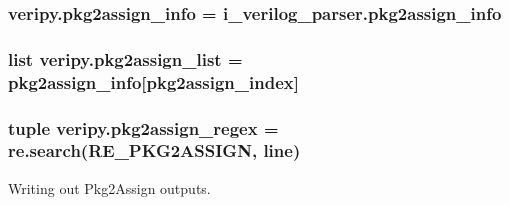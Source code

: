 \hypertarget{namespaceveripy_abb8af7474ba6f1fe4499f0baf5e6c9da}{
\subsubsection[{pkg2assign\-\_\-info}]{\setlength{\rightskip}{0pt plus 5cm}veripy.\-pkg2assign\-\_\-info = i\-\_\-verilog\-\_\-parser.\-pkg2assign\-\_\-info}}\label{namespaceveripy_abb8af7474ba6f1fe4499f0baf5e6c9da}
\hypertarget{namespaceveripy_abab8384e1cd583db34af81db27a52544}{
\subsubsection[{pkg2assign\-\_\-list}]{\setlength{\rightskip}{0pt plus 5cm}list veripy.\-pkg2assign\-\_\-list = {\bf pkg2assign\-\_\-info}\mbox{[}{\bf pkg2assign\-\_\-index}\mbox{]}}}\label{namespaceveripy_abab8384e1cd583db34af81db27a52544}
\hypertarget{namespaceveripy_a818213d44f5908b15037e7f70a2d5882}{
\subsubsection[{pkg2assign\-\_\-regex}]{\setlength{\rightskip}{0pt plus 5cm}tuple veripy.\-pkg2assign\-\_\-regex = re.\-search(R\-E\-\_\-\-P\-K\-G2\-A\-S\-S\-I\-G\-N, {\bf line})}}\label{namespaceveripy_a818213d44f5908b15037e7f70a2d5882}


Writing out Pkg2\-Assign outputs. 

